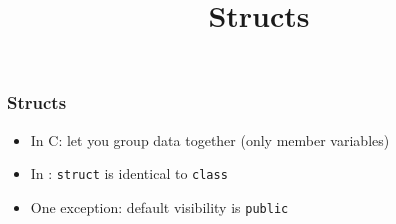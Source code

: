
\usetikzlibrary{shadows,shapes.multipart}

\title{Structs}






\begin{frame}
  \titlepage
\end{frame}

\begin{frame}
  \frametitle{Structs}
  \begin{itemize}
    \item In C: let you group data together (only member variables)
    \item In \cpp: {\tt struct} is identical to {\tt class}
    \item One exception: default visibility is {\tt public}
  \end{itemize}
  \begin{columns}
    \column{4cm}
    \column{4cm}
  \end{columns}
\end{frame}




